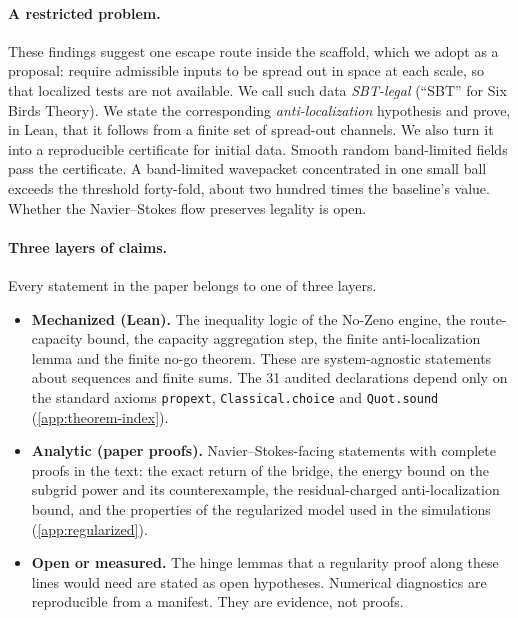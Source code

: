 \paragraph{A restricted problem.}
These findings suggest one escape route inside the scaffold, which we adopt as a proposal: require
admissible inputs to be spread out in space at each scale, so that localized tests are not available. We call such data
\emph{SBT-legal} (``SBT'' for Six Birds Theory). We state the corresponding
\emph{anti-localization} hypothesis and prove, in Lean, that it follows from a finite set of spread-out channels. We also turn
it into a reproducible certificate for initial data. Smooth random band-limited fields pass the
certificate. A band-limited wavepacket concentrated in one small ball exceeds the threshold forty-fold,
about two hundred times the baseline's value. Whether the Navier--Stokes flow preserves legality is open.

\paragraph{Three layers of claims.}
Every statement in the paper belongs to one of three layers.
\begin{itemize}
\item \textbf{Mechanized (Lean).} The inequality logic of the No-Zeno engine, the route-capacity
bound, the capacity aggregation step, the finite anti-localization lemma and the finite no-go
theorem. These are system-agnostic statements about sequences and finite sums. The 31 audited
declarations depend only on the standard axioms \texttt{propext}, \texttt{Classical.choice} and
\texttt{Quot.sound} (\cref{app:theorem-index}).
\item \textbf{Analytic (paper proofs).} Navier--Stokes-facing statements with complete proofs in
the text: the exact return of the bridge, the energy bound on the subgrid power and its
counterexample, the residual-charged anti-localization bound, and the properties of the
regularized model used in the simulations (\cref{app:regularized}).
\item \textbf{Open or measured.} The hinge lemmas that a regularity proof along these lines would
need are stated as open hypotheses. Numerical diagnostics are reproducible from a manifest. They
are evidence, not proofs.
\end{itemize}

